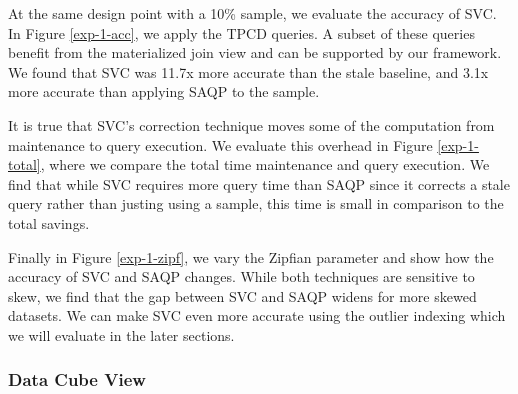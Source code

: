 At the same design point with a 10\% sample, we evaluate the accuracy of SVC.
In Figure \ref{exp-1-acc}, we apply the TPCD queries.
A subset of these queries benefit from the materialized join view and can be supported by our framework.
We found that SVC was 11.7x  more accurate than the stale baseline, and 3.1x more accurate than applying SAQP to the sample.


It is true that SVC's correction technique moves some of the computation from maintenance to query execution.
We evaluate this overhead in Figure \ref{exp-1-total}, where we compare the total time maintenance and query execution.
We find that while SVC requires more query time than SAQP since it corrects a stale query rather than justing using a sample, 
this time is small in comparison to the total savings. 

Finally in Figure \ref{exp-1-zipf}, we vary the Zipfian parameter and show how the accuracy of SVC and SAQP changes.
While both techniques are sensitive to skew, we find that the gap between SVC and SAQP widens for more skewed datasets. 
We can make SVC even more accurate using the outlier indexing which we will evaluate in the later sections.

\subsubsection{Data Cube View}
\label{exp-datacube}

